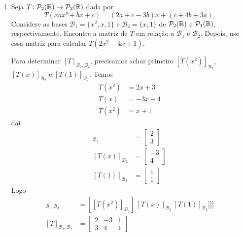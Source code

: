 \begin{exemplos}
\begin{enumerate}[label={\arabic*})]
    \item Seja $T \colon \mathcal{P}_2(\mathbb{R}) \to \mathcal{P}_2(\mathbb{R})$ dada por
    \[
      T(xax² + bx + c) = (2a + c - 3b)x + (c + 4b + 3a).
    \]
    Considere as bases $\mathcal{B}_1 = \{x^2, x, 1\}$ e $\mathcal{B}_2 = \{x, 1\}$ de $\mathcal{P}_2(\mathbb{R})$ e $\mathcal{P}_1(\mathbb{R})$, respectivamente. Encontre a matriz de $T$ em relação a $\mathcal{B}_1
$ e $\mathcal{B}_2$. Depois, use essa matriz para calcular $T(2x^2 - 4x + 1)$.
    \begin{solucao}
      Para determinar $[T]_{\mathcal{B}_1, \mathcal{B}_2}$, precisamos achar primeiro $[T(x^2)]_{\mathcal{B}_2}$, $[T(x)]_{\mathcal{B}_2}$ e $[T(1)]_{\mathcal{B}_2}$.
      Temos
      \begin{align*}
        T(x^2) &= 2x + 3\\
        T(x) &= -3x + 4\\
        T(x^2) &= x + 1
      \end{align*}
      daí
      \begin{align*}
        [T(x^2)]_{\mathcal{B}_2} &= \begin{bmatrix}2\\3\end{bmatrix}\\
        [T(x)]_{\mathcal{B}_2} &= \begin{bmatrix}-3\\4\end{bmatrix}\\
        [T(1)]_{\mathcal{B}_2} &= \begin{bmatrix}1\\1\end{bmatrix}
      \end{align*}
      Logo
      \begin{align*}
        [T]_{\mathcal{B}_1, \mathcal{B}_2} &= [[T(x^2)]_{\mathcal{B}_2}]\ [T(x)]_{\mathcal{B}_2}\ [T(1)]_{\mathcal{B}_2}]]]\\
        [T]_{\mathcal{B}_1, \mathcal{B}_2} &= \begin{bmatrix}2 & -3 & 1\\3 & 4 & 1\end{bmatrix}
      \end{align*}


\end{solucao}
\end{enumerate}
\end{exemplos}
